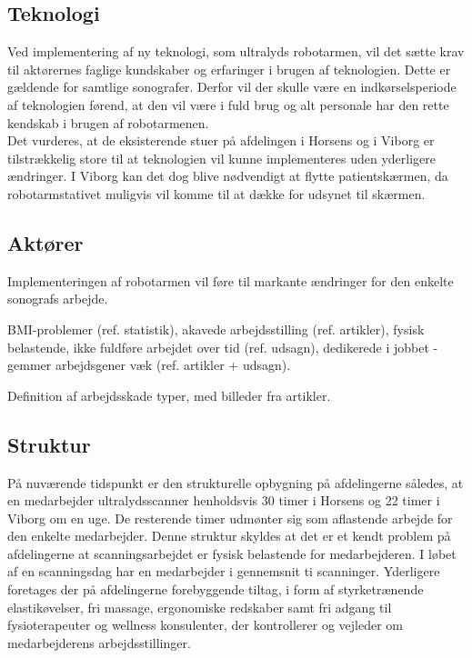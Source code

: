 \subsection{Teknologi}
Ved implementering af ny teknologi, som ultralyds robotarmen, vil det sætte krav til aktørernes faglige kundskaber og erfaringer i brugen af teknologien. Dette er gældende for samtlige sonografer. Derfor vil der skulle være en indkørselsperiode af teknologien førend, at den vil være i fuld brug og alt personale har den rette kendskab i brugen af robotarmenen. \\
Det vurderes, at de eksisterende stuer på afdelingen i Horsens og i Viborg er tilstrækkelig store til at teknologien vil kunne implementeres uden yderligere ændringer. I Viborg kan det dog blive nødvendigt at flytte patientskærmen, da robotarmstativet muligvis vil komme til at dække for udsynet til skærmen.  

\subsection{Aktører}
Implementeringen af robotarmen vil føre til markante ændringer for den enkelte sonografs arbejde.

BMI-problemer (ref. statistik), akavede arbejdsstilling (ref. artikler), fysisk belastende, ikke fuldføre arbejdet over tid (ref. udsagn), dedikerede i jobbet - gemmer arbejdsgener væk (ref. artikler + udsagn).

Definition af arbejdsskade typer, med billeder fra artikler. 

\subsection{Struktur}
På nuværende tidspunkt er den strukturelle opbygning på afdelingerne således, at en medarbejder ultralydsscanner henholdsvis 30 timer i Horsens og 22 timer i Viborg om en uge. De resterende timer udmønter sig som aflastende arbejde for den enkelte medarbejder. Denne struktur skyldes at det er et kendt problem på afdelingerne at scanningsarbejdet er fysisk belastende for medarbejderen. I løbet af en scanningsdag har en medarbejder i gennemsnit ti scanninger. Yderligere foretages der på afdelingerne forebyggende tiltag, i form af styrketrænende elastikøvelser, fri massage, ergonomiske redskaber samt fri adgang til fysioterapeuter og wellness konsulenter, der kontrollerer og vejleder om medarbejderens arbejdsstillinger.

